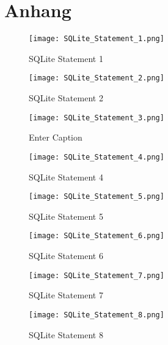 \documentclass{article}
\begin{document}
\newpage

\section*{Anhang} 
\hypertarget{anhang}{}

\begin{figure} [h!]
    \centering
    \texttt{[image: SQLite\_Statement\_1.png]}
    \caption{SQLite Statement 1}
    \label{fig:enter-label}
\end{figure}

\begin{figure} [h!]
    \centering
    \texttt{[image: SQLite\_Statement\_2.png]}
    \caption{SQLite Statement 2}
    \label{fig:enter-label}
\end{figure}

\begin{figure} [h!]
    \centering
    \texttt{[image: SQLite\_Statement\_3.png]}
    \caption{Enter Caption}
    \label{fig:enter-label}
\end{figure}

\begin{figure} [h!]
    \centering
    \texttt{[image: SQLite\_Statement\_4.png]}
    \caption{SQLite Statement 4}
    \label{fig:enter-label}
\end{figure}

\begin{figure} [h!]
    \centering
    \texttt{[image: SQLite\_Statement\_5.png]}
    \caption{SQLite Statement 5}
    \label{fig:enter-label}
\end{figure}

\begin{figure} [h!]
    \centering
    \texttt{[image: SQLite\_Statement\_6.png]}
    \caption{SQLite Statement 6}
    \label{fig:enter-label}
\end{figure}

\begin{figure}
    \centering
    \texttt{[image: SQLite\_Statement\_7.png]}
    \caption{SQLite Statement 7}
    \label{fig:enter-label}
\end{figure}

\begin{figure}
    \centering
    \texttt{[image: SQLite\_Statement\_8.png]}
    \caption{SQLite Statement 8}
    \label{fig:enter-label}
\end{figure}
\end{document}
